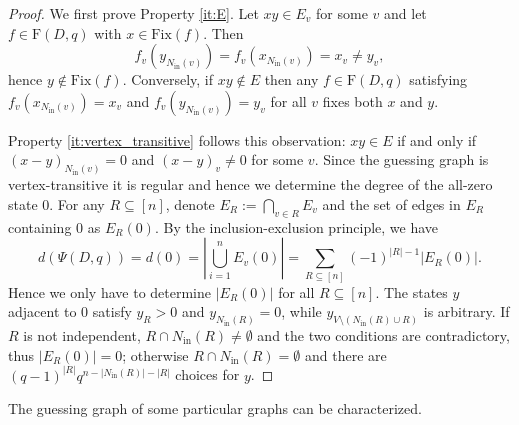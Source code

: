 \documentclass[a4paper, 11pt]{book}
\numberwithin{equation}{section}
\theoremstyle{plain}
\newcommand{\neighbourhood}{N}
\newcommand{\degree}{d}
\newcommand{\inn}[1]{#1_\mathrm{in}}
\newcommand{\NIn}{\inn{\neighbourhood}}
\newcommand{\functions}{\mathrm{F}}
\newcommand{\Fix}{\mathrm{Fix}}
\newcommand{\guessingGraph}{\Psi}
\renewcommand{\(}{\ldbrack}
\renewcommand{\)}{\rdbrack}
\begin{document}
\begin{proof}
We first prove Property \ref{it:E}. Let $xy \in E_v$ for some $v$ and let $f \in \functions(D,q)$ with $x \in \Fix(f)$. Then 
\[
	f_v(y_{\NIn(v)}) = f_v(x_{\NIn(v)}) = x_v \ne y_v,
\]
hence $y\not\in\Fix(f)$. Conversely, if $xy \notin E$ then any $f \in \functions(D,q)$ satisfying $f_v (x_{\NIn(v)}) = x_v$ and $f_v(y_{\NIn(v)}) = y_v$ for all $v$ fixes both $x$ and $y$.

Property \ref{it:vertex_transitive} follows this observation: $xy \in E$ if and only if $(x-y)_{\NIn(v)} = 0$ and $(x-y)_v \ne 0$ for some $v$. Since the guessing graph is vertex-transitive it is regular and hence we determine the degree of the all-zero state $0$. For any $R \subseteq [n]$, denote $E_R := \bigcap_{v \in R} E_v$ and the set of edges in $E_R$ containing $0$ as $E_R(0)$. By the inclusion-exclusion principle, we have
\[
	\degree(\guessingGraph(D,q)) = \degree(0) = \left|\bigcup_{i=1}^n E_v(0) \right| = \sum_{R \subseteq [n]} (-1)^{|R|-1} |E_R(0)|.
\]
Hence we only have to determine $|E_R(0)|$ for all $R \subseteq [n]$. The states $y$ adjacent to $0$ satisfy $y_R>0$ and $y_{\NIn(R)} = 0$, while $y_{V \setminus( \NIn(R) \cup R)}$ is arbitrary. If $R$ is not independent, $R \cap \NIn(R) \ne \emptyset$ and the two conditions are contradictory, thus $|E_R(0)| = 0$; otherwise $R \cap \NIn(R) = \emptyset$ and there are $(q-1)^{|R|} q^{n - |\NIn(R)| - |R|}$ choices for $y$. 
\end{proof}

The guessing graph of some particular graphs can be characterized.
\end{document}

